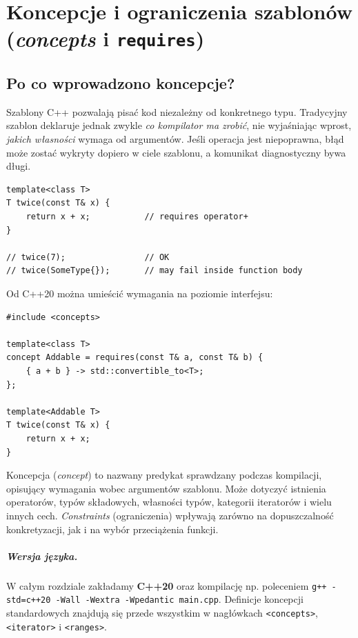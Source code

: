 
\chapter[Concepts i requires w C++]{Koncepcje i ograniczenia szablonów (\textit{concepts} i \texttt{requires})}
\label{chap:concepts-cpp}

\section{Po co wprowadzono koncepcje?}

Szablony C++ pozwalają pisać kod niezależny od konkretnego typu.
Tradycyjny szablon deklaruje jednak zwykle \emph{co kompilator ma zrobić},
nie wyjaśniając wprost, \emph{jakich własności} wymaga od argumentów.
Jeśli operacja jest niepoprawna, błąd może zostać wykryty dopiero w ciele
szablonu, a komunikat diagnostyczny bywa długi.

\begin{lstlisting}
template<class T>
T twice(const T& x) {
    return x + x;           // requires operator+
}

// twice(7);                // OK
// twice(SomeType{});       // may fail inside function body
\end{lstlisting}

Od C++20 można umieścić wymagania na poziomie interfejsu:

\begin{lstlisting}
#include <concepts>

template<class T>
concept Addable = requires(const T& a, const T& b) {
    { a + b } -> std::convertible_to<T>;
};

template<Addable T>
T twice(const T& x) {
    return x + x;
}
\end{lstlisting}

Koncepcja (\textit{concept}) to nazwany predykat sprawdzany podczas
kompilacji, opisujący wymagania wobec argumentów szablonu.
Może dotyczyć istnienia operatorów, typów składowych, własności typów,
kategorii iteratorów i wielu innych cech. \emph{Constraints}
(ograniczenia) wpływają zarówno na dopuszczalność konkretyzacji,
jak i na wybór przeciążenia funkcji.

\paragraph{Wersja języka.}
W całym rozdziale zakładamy \textbf{C++20} oraz kompilację
np. poleceniem \texttt{g++ -std=c++20 -Wall -Wextra -Wpedantic main.cpp}.
Definicje koncepcji standardowych znajdują się przede wszystkim
w nagłówkach \texttt{<concepts>}, \texttt{<iterator>} i
\texttt{<ranges>}.

